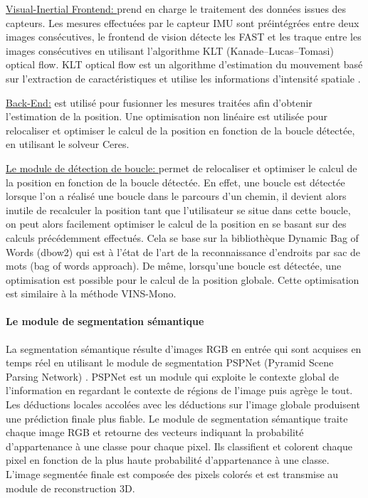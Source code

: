 \documentclass[11pt]{article}
\begin{document}
          \underline{Visual-Inertial Frontend: }
            prend en charge le traitement des données issues des capteurs. Les mesures effectuées par le capteur IMU
            sont préintégrées entre deux images consécutives, le frontend de vision détecte les FAST
            et les traque entre les images consécutives en utilisant l'algorithme KLT (Kanade–Lucas–Tomasi) optical flow. KLT optical flow est un 
            algorithme d'estimation du mouvement basé sur l'extraction de caractéristiques et utilise les informations d'intensité spatiale 
            \cite{lucasIterativeImageRegistration} \cite{suhrKanadeLucasTomasiKLTFeature2009}.

          \underline{Back-End:} est utilisé pour fusionner les mesures traitées afin d'obtenir l'estimation de la position. Une optimisation non linéaire
            est utilisée pour relocaliser et optimiser le calcul de la position en fonction de la boucle détectée, en utilisant le solveur Ceres. 

          \underline{Le module de détection de boucle: } permet de relocaliser et optimiser le calcul de la position en fonction de
            la boucle détectée. En effet, une boucle est détectée lorsque l'on a réalisé une boucle dans le parcours d'un chemin, il devient alors inutile
            de recalculer la position tant que l'utilisateur se situe dans cette boucle, on peut alors facilement optimiser le calcul de la position en se 
            basant sur des calculs précédemment effectués. Cela se base sur la bibliothèque Dynamic Bag of Words (\acrshort{dbow2}) qui est à l'état de l'art de la reconnaissance d'endroits 
            par sac de mots (bag of words approach). De même, lorsqu'une boucle est détectée, une optimisation est possible pour le calcul de la position 
            globale. Cette optimisation est similaire à la méthode VINS-Mono.

          \paragraph{Le module de segmentation sémantique}
            La segmentation sémantique résulte d'images RGB en entrée qui sont acquises en temps réel en utilisant le module de segmentation PSPNet
            (Pyramid Scene Parsing Network) \cite{zhaoPyramidSceneParsing2017}. PSPNet est un module qui exploite le contexte global de l'information en regardant le contexte de 
            régions de l'image puis agrège le tout. Les déductions locales accolées avec les déductions sur l'image globale produisent une prédiction
            finale plus fiable.
            Le module de segmentation sémantique traite chaque image RGB et retourne des vecteurs indiquant la probabilité d'appartenance à une classe
            pour chaque pixel. Ils classifient et colorent chaque pixel en fonction de la plus haute probabilité d'appartenance à une classe. 
            L'image segmentée finale est composée des pixels colorés et est transmise au module de reconstruction 3D.
\end{document}

